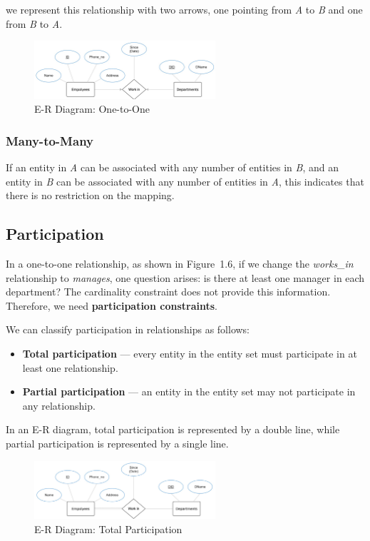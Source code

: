 we represent this relationship with two arrows, one pointing from \emph{A} to \emph{B} and one from \emph{B} to \emph{A}.

\begin{figure}[H]
  \centering
  \includegraphics[width=0.6\textwidth]{Figure/ER5.pdf}
  \caption{E-R Diagram: One-to-One}
\end{figure}

\subsubsection{Many-to-Many}
If an entity in \emph{A} can be associated with any number of entities in \emph{B}, and an entity in \emph{B} can be associated with any number of entities in \emph{A}, this indicates that there is no restriction on the mapping.

\subsection{Participation}
In a one-to-one relationship, as shown in Figure~1.6, if we change the \emph{works\_in} relationship to \emph{manages}, one question arises: is there at least one manager in each department? The cardinality constraint does not provide this information. Therefore, we need \textbf{participation constraints}.

We can classify participation in relationships as follows:
\begin{itemize}
  \item \textbf{Total participation} — every entity in the entity set must participate in at least one relationship.
  \item \textbf{Partial participation} — an entity in the entity set may not participate in any relationship.
\end{itemize}

In an E-R diagram, total participation is represented by a double line, while partial participation is represented by a single line.  

\begin{figure}[H]
  \centering
  \includegraphics[width=0.6\textwidth]{Figure/ER6.pdf}
  \caption{E-R Diagram: Total Participation}
\end{figure}

